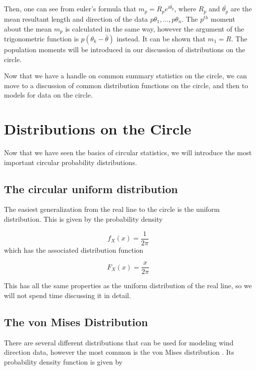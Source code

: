 \documentclass[12pt]{article}
\numberwithin{equation}{section}
\numberwithin{figure}{section}
\begin{document}
Then, one can see from euler's formula that $m_p = R_pe^{i\bar{\theta_p}}$, where $R_p$ and $\bar{\theta_p}$ are the mean resultant length and direction of the data $p\theta_1, ..., p\theta_n$. The $p^{th}$ moment about the mean $m_p$ is calculated in the same way, however the argument of the trigonometric function is $p(\theta_k-\bar{\theta})$ instead. It can be shown that $m_1 = R$. The population moments will be introduced in our discussion of distributions on the circle.

Now that we have a handle on common summary statistics on the circle, we can move to a discussion of common distribution functions on the circle, and then to models for data on the circle. 

\section{Distributions on the Circle}

Now that we have seen the basics of circular statistics, we will introduce the most important circular probability distributions. 

\subsection{The circular uniform distribution}

The easiest generalization from the real line to the circle is the uniform distribution. This is given by the probability density

\begin{equation}\label{uniformpdf}
f_X(x) = \frac{1}{2\pi} 
\end{equation}
which has the associated distribution function 

\begin{equation}\label{uniformcdf}
F_X(x) = \frac{x}{2\pi}
\end{equation}

This has all the same properties as the uniform distribution of the real line, so we will not spend time discussing it in detail. 

\subsection{The von Mises Distribution}
There are several different distributions that can be used for modeling wind direction data, however the most common is the von Mises distribution \cite{Al Yammahi}. Its probability density function is given by
\end{document}

